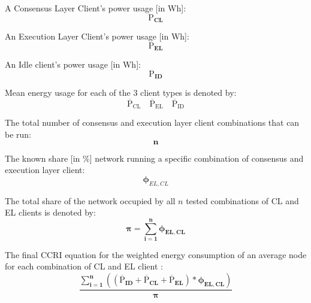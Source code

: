 \begin{center}
A Consensus Layer Client's power usage [in Wh]:
\begin{equation*}
    \boldsymbol{\mathrm{P}_{CL}}
\end{equation*}

An Execution Layer Client's power usage [in Wh]:
\begin{equation*}
    \boldsymbol{\mathrm{P}_{EL}}
\end{equation*}
 
 An Idle client's power usage [in Wh]:
 \begin{equation*}
    \boldsymbol{\mathrm{P}_{ID}}
\end{equation*} 

Mean energy usage for each of the 3 client types is denoted by: 
\begin{equation*}
  \boldsymbol{\mathrm{{\overline{P}}_{CL}}}\quad      \boldsymbol{\mathrm{{\overline{P}}_{EL}}}\quad  \boldsymbol{\mathrm{{\overline{P}}_{ID}}}   
\end{equation*}

The total number of consensus and execution layer client combinations that can be run:
\begin{equation*}
    \boldsymbol{n}
\end{equation*}

The known share [in \%] network running a specific combination of consensus and execution layer client:
\begin{equation*}
    \boldsymbol{\phi}_{EL,CL} 
\end{equation*}

The total share of the network occupied by all ${n}$ tested combinations of CL and EL clients is denoted by:
\begin{equation*}
    \boldsymbol{{\pi} = \displaystyle\sum\limits_{i=1}^{n}{\phi_{EL,CL}}}
\end{equation*}

The final CCRI equation for the weighted energy consumption of an average node for each combination of CL and EL client \cite{CryptoCarbonRatingsInstitute2022TheNetwork}: 
\label{CCRIBaseEqnSection}
\begin{equation}
\boldsymbol{\frac{\displaystyle\sum\limits_{i=1}^{n}{ \left({\left(\mathrm{\overline{P}}_{ID} + \mathrm{\overline{P}}_{CL} + \mathrm{\overline{P}}_{EL}\right)} * {\phi_{EL,CL}} \right)}}
 {\pi}}\label{eqn:CCRI}
\end{equation}
\end{center}

